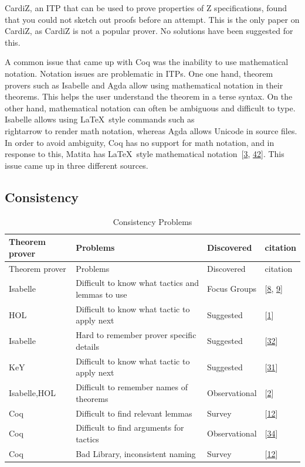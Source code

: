 \documentclass[
]{article}
\begin{document}
CardiZ, an ITP that can be used to prove properties of Z specifications,
found that you could not sketch out proofs before an attempt. This is
the only paper on CardiZ, as CardiZ is not a popular prover. No
solutions have been suggested for this.

A common issue that came up with Coq was the inability to use
mathematical notation. Notation issues are problematic in ITPs. One one
hand, theorem provers such as Isabelle and Agda allow using mathematical
notation in their theorems. This helps the user understand the theorem
in a terse syntax. On the other hand, mathematical notation can often be
ambiguous and difficult to type. Isabelle allows using LaTeX~style
commands such as\\
rightarrow to render math notation, whereas Agda allows Unicode in
source files. In order to avoid ambiguity, Coq has no support for math
notation, and in response to this, Matita has LaTeX~style mathematical
notation~{[}\protect\hyperlink{ref-asperti_user_2007}{3},
\protect\hyperlink{ref-zacchiroli_user_2007}{42}{]}. This issue came up
in three different sources.

\hypertarget{consistency-1}{%
\subsection{Consistency}\label{consistency-1}}

\hypertarget{tbl:consistency}{}
\begin{longtable}[]{@{}llll@{}}
\caption{\label{tbl:consistency}Consistency Problems}\tabularnewline
\toprule
Theorem prover & Problems & Discovered & citation \\
\midrule
\endfirsthead
\toprule
Theorem prover & Problems & Discovered & citation \\
\midrule
\endhead
Isabelle & Difficult to know what tactics and lemmas to use & Focus
Groups & {[}\protect\hyperlink{ref-beckert_usability_2015}{8},
\protect\hyperlink{ref-beckert_interaction_2017}{9}{]} \\
HOL & Difficult to know what tactic to apply next & Suggested &
{[}\protect\hyperlink{ref-aitken_interactive_1998}{1}{]} \\
Isabelle & Hard to remember prover specific details & Suggested &
{[}\protect\hyperlink{ref-nagashima_pamper_2018}{32}{]} \\
KeY & Difficult to know what tactic to apply next & Suggested &
{[}\protect\hyperlink{ref-mitsch_keymaera_2017}{31}{]} \\
Isabelle,HOL & Difficult to remember names of theorems & Observational &
{[}\protect\hyperlink{ref-aitken_analysis_2000}{2}{]} \\
Coq & Difficult to find relevant lemmas & Survey &
{[}\protect\hyperlink{ref-berman_development_2014}{12}{]} \\
Coq & Difficult to find arguments for tactics & Observational &
{[}\protect\hyperlink{ref-ringer_replica_2020}{34}{]} \\
Coq & Bad Library, inconsistent naming & Survey &
{[}\protect\hyperlink{ref-berman_development_2014}{12}{]} \\
\bottomrule
\end{longtable}
\end{document}
